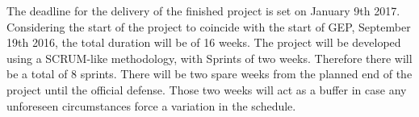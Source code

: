 The deadline for the delivery of the finished project is set on January 9th 2017. Considering the start of the project to coincide with the start of GEP, September 19th 2016, the total duration will be of 16 weeks. The project will be developed using a SCRUM-like methodology, with Sprints of two weeks. Therefore there will be a total of 8 sprints. There will be two spare weeks from the planned end of the project until the official defense. Those two weeks will act as a buffer in case any unforeseen circumstances force a variation in the schedule.